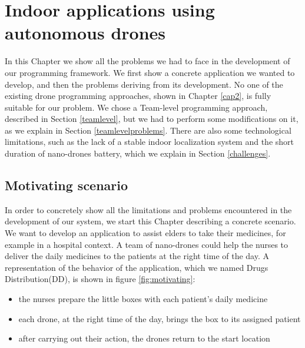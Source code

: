 \chapter{Indoor applications using autonomous drones}
\label{cap3}

In this Chapter we show all the problems we had to face in the development of our programming framework. 
We first show a concrete application we wanted to develop, and then the problems deriving from its development.
No one of the existing drone programming approaches, shown in Chapter \ref{cap2}, is fully suitable for our problem.
We chose a Team-level programming approach, described in Section \ref{teamlevel}, but we had to perform some modifications on it, as we explain in Section \ref{teamlevelproblems}.
There are also some technological limitations, such as the lack of a stable indoor localization system and the short duration of nano-drones battery, which we explain in Section \ref{challenges}.

\section{Motivating scenario\label{motivating}}

In order to concretely show all the limitations and problems encountered in the development of our system, we start this Chapter describing a concrete scenario.
We want to develop an application to assist elders to take their medicines, for example in a hospital context.
A team of nano-drones could help the nurses to deliver the daily medicines to the patients at the right time of the day.
A representation of the behavior of the application, which we named Drugs Distribution(DD), is shown in figure \ref{fig:motivating}:


\begin{itemize}
\itemsep2pt
\item{
the nurses prepare the little boxes with each patient’s daily medicine
}
\item{
each drone, at the right time of the day, brings the box to its assigned patient
}
\item{
after carrying out their action, the drones return to the start location
}

\end{itemize}


